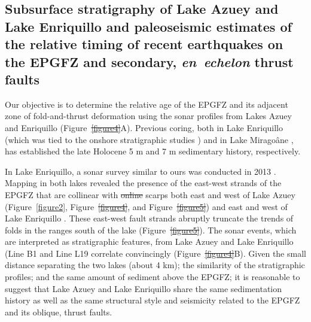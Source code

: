 \documentclass[linenumbers,draft]{agujournal}
\providecommand{\DIFaddtex}[1]{{\protect\color{blue}\uwave{#1}}} %
\providecommand{\DIFdeltex}[1]{{\protect\color{red}\sout{#1}}}                      %
\providecommand{\DIFaddbegin}{} %
\providecommand{\DIFaddend}{} %
\providecommand{\DIFdelbegin}{} %
\providecommand{\DIFdelend}{} %
\providecommand{\DIFadd}[1]{\texorpdfstring{\DIFaddtex{#1}}{#1}} %
\providecommand{\DIFdel}[1]{\texorpdfstring{\DIFdeltex{#1}}{}} %
\begin{document}
\subsection{Subsurface stratigraphy of Lake Azuey and Lake Enriquillo and paleoseismic estimates of the relative timing of recent earthquakes on the EPGFZ and secondary, \textit{en~echelon} thrust faults}
Our objective is to determine the relative age of the EPGFZ and its adjacent zone of fold-and-thrust deformation using the sonar profiles from Lakes Azuey and Enriquillo (Figure~\DIFdelbegin \DIFdel{\ref{figure4}}\DIFdelend \DIFaddbegin \DIFadd{\ref{figure6}}\DIFaddend A). Previous coring, both in Lake Enriquillo \citep{rios2013holocene} (which was tied to the onshore stratigraphic studies \citep{taylor1985stratigraphy,rios2013holocene}) and in Lake Mirago\^ane \citep{higuera199910}, has established the late Holocene 5 m and 7 m sedimentary history, respectively.

In Lake Enriquillo, a sonar survey similar to ours was conducted in 2013 \citep{rios2013holocene}. Mapping in both lakes revealed the presence of the east-west strands of the EPGFZ that are collinear with \DIFdelbegin \DIFdel{online }\DIFdelend \DIFaddbegin \DIFadd{onland }\DIFaddend scarps both east and west of Lake Azuey (Figure~\ref{figure2}, Figure~\DIFdelbegin \DIFdel{\ref{figure4}}\DIFdelend \DIFaddbegin \DIFadd{\ref{figure6}}\DIFaddend , and Figure~\DIFdelbegin \DIFdel{\ref{figure5}}\DIFdelend \DIFaddbegin \DIFadd{\ref{figure4}}\DIFaddend ) and east and west of Lake Enriquillo \citep{mann1995actively,rios2013holocene}. These east-west fault strands abruptly truncate the trends of folds in the ranges south of the lake (Figure~\DIFdelbegin \DIFdel{\ref{figure5}}\DIFdelend \DIFaddbegin \DIFadd{\ref{figure4}}\DIFaddend ). The sonar events, which are interpreted as stratigraphic features, from Lake Azuey and Lake Enriquillo (Line B1 and Line L19 correlate convincingly (Figure~\DIFdelbegin \DIFdel{\ref{figure4}}\DIFdelend \DIFaddbegin \DIFadd{\ref{figure6}}\DIFaddend B). Given the small distance separating the two lakes (about 4 km); the similarity of the stratigraphic profiles; and the same amount of sediment above the EPGFZ; it is reasonable to suggest that Lake Azuey and Lake Enriquillo share the same sedimentation history as well as the same structural style and seismicity related to the EPGFZ and its oblique, thrust faults.
\end{document}

